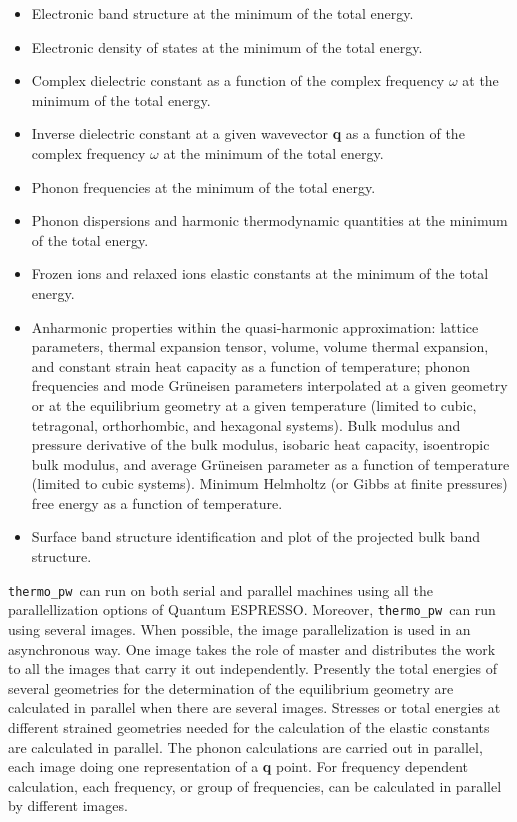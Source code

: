 \documentclass[12pt,a4paper]{article}
\def\qe{{\sc Quantum ESPRESSO}}
\def\thermo{\texttt{thermo\_pw}}
\begin{document}
\begin{itemize}
\item Electronic band structure at the minimum of the total energy.

\item Electronic density of states at the minimum of the total energy.

\item Complex dielectric constant as a function of the complex
frequency $\omega$ at the minimum of the total energy.

\item Inverse dielectric constant at a given wavevector {\bf q} as a function 
of the complex frequency $\omega$ at the minimum of the total energy.

\item Phonon frequencies at the minimum of the total energy.

\item Phonon dispersions and harmonic thermodynamic quantities
at the minimum of the total energy.

\item Frozen ions and relaxed ions elastic constants at the minimum of the total
energy.

\item Anharmonic properties within the quasi-harmonic approximation: 
lattice parameters, thermal expansion tensor, volume, volume thermal 
expansion, and constant strain heat capacity as a function of temperature; 
phonon frequencies and mode Gr\"uneisen parameters interpolated at a given
geometry or at the equilibrium geometry at a given temperature
(limited to cubic, tetragonal, orthorhombic, and hexagonal systems).
Bulk modulus and pressure derivative of the bulk modulus, isobaric heat 
capacity, isoentropic bulk modulus, and average Gr\"uneisen parameter as 
a function of temperature (limited to cubic systems).
Minimum Helmholtz (or Gibbs at finite pressures) free energy 
as a function of temperature.

\item Surface band structure identification and plot of the projected bulk
band structure.

\end{itemize}

\thermo\ can run on both serial and parallel machines using all 
the parallellization options of \qe. Moreover, \thermo\ can run using 
several images.
When possible, the image parallelization is used in an asynchronous way.
One image takes the role of master and distributes the work 
to all the images that carry it out independently. Presently 
the total energies of several geometries for the determination of the 
equilibrium geometry are calculated in parallel when
there are several images. Stresses or total energies at different strained 
geometries needed for the calculation of the elastic constants are 
calculated in parallel. 
The phonon calculations are carried out in parallel, each image doing one 
representation of a {\bf q} point. For frequency dependent calculation,
each frequency, or group of frequencies, can be calculated in parallel
by different images.
\end{document}
